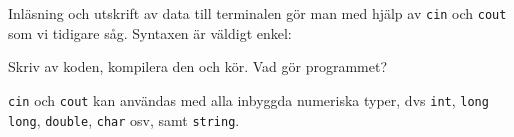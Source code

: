 Inläsning och utskrift av data till terminalen gör man med hjälp av \texttt{cin} och \texttt{cout} som vi tidigare såg. Syntaxen är väldigt enkel:



Skriv av koden, kompilera den och kör. Vad gör programmet?

\texttt{cin} och \texttt{cout} kan användas med alla inbyggda numeriska typer, dvs \texttt{int}, \texttt{long long}, \texttt{double}, \texttt{char} osv, samt \texttt{string}.
